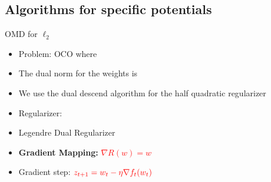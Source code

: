 \documentclass{beamer}
\begin{document}
\begin{small}
\section{Algorithms for specific potentials}

\begin{frame}{OMD for $\ell_2$}
  \begin{itemize}
  \item Problem: OCO where  
  \item The dual norm for the weights is 
  \item We use the dual descend algorithm for the half quadratic regularizer 
  \item Regularizer: 
  \item Legendre Dual Regularizer 
    \item \textbf{Gradient Mapping:} \textcolor{red}{$\nabla R(w) = w$}
\item Gradient step: $\textcolor{red}{z_{t+1} = w_t - \eta \nabla f_t(w_t)}$

    \end{itemize}
\end{frame}


\end{small}
\end{document}
